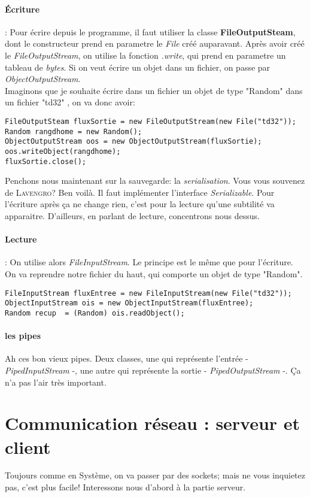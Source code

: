 \documentclass{article}
\begin{document}
\paragraph{Écriture} : Pour écrire depuis le programme, il faut utiliser la classe \textbf{FileOutputSteam}, dont le constructeur prend en parametre le \emph{File} créé auparavant. Après avoir créé le \emph{FileOutputStream}, on utilise la fonction \emph{.write}, qui prend en parametre un tableau de \emph{bytes}. Si on veut écrire un objet dans un fichier,  on passe par  \emph{ObjectOutputStream}.\\
Imaginons que je souhaite écrire dans un fichier un objet de type "Random" dans un fichier "td32" , on va donc avoir:
\begin{lstlisting}
FileOutputSteam fluxSortie = new FileOutputStream(new File("td32"));
Random rangdhome = new Random();
ObjectOutputStream oos = new ObjectOutputStream(fluxSortie);
oos.writeObject(rangdhome);
fluxSortie.close();
\end{lstlisting}
Penchons nous maintenant sur la sauvegarde: la \emph{serialisation}. Vous vous souvenez de \textsc{Lavengro}? Ben voilà. Il faut implémenter l'interface \emph{Serializable}. Pour l'écriture après ça ne change rien, c'est pour la lecture qu'une subtilité va apparaitre. D'ailleurs, en parlant de lecture, concentrons nous dessus.
\paragraph{Lecture} : On utilise alors \emph{FileInputStream}. Le principe est le même que pour l'écriture. On va reprendre notre fichier du haut, qui comporte un objet de type "Random". 
\begin{lstlisting}
FileInputStream fluxEntree = new FileInputStream(new File("td32"));
ObjectInputStream ois = new ObjectInputStream(fluxEntree);
Random recup  = (Random) ois.readObject();
\end{lstlisting}

\paragraph{les pipes}
Ah ces bon vieux pipes. Deux classes, une qui représente l'entrée - \emph{PipedInputStream} -, une autre qui représente la sortie - \emph{PipedOutputStream} -. Ça n'a pas l'air très important.

\section{Communication réseau : serveur et client}
Toujours comme en Système, on va passer par des sockets; mais ne vous inquietez pas, c'est plus facile! Interessons nous d'abord à la partie serveur.
\end{document}
